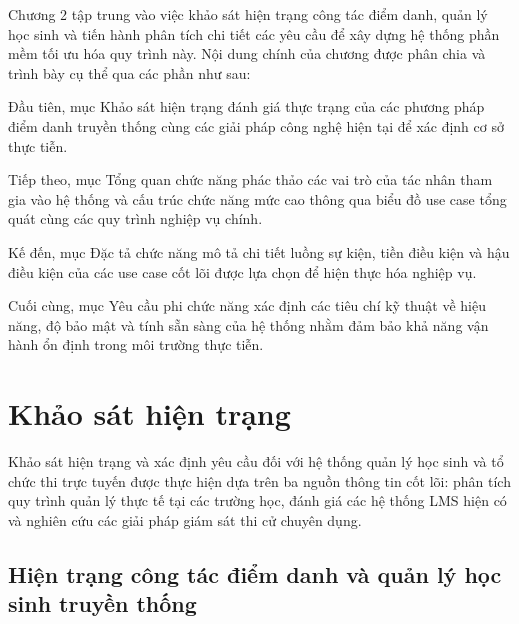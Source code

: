 \documentclass[../DoAn.tex]{subfiles}
\begin{document}


Chương 2 tập trung vào việc khảo sát hiện trạng công tác điểm danh, quản lý học sinh và tiến hành phân tích chi tiết các yêu cầu để xây dựng hệ thống phần mềm tối ưu hóa quy trình này. Nội dung chính của chương được phân chia và trình bày cụ thể qua các phần như sau:

Đầu tiên, mục Khảo sát hiện trạng đánh giá thực trạng của các phương pháp điểm danh truyền thống cùng các giải pháp công nghệ hiện tại để xác định cơ sở thực tiễn.

Tiếp theo, mục Tổng quan chức năng phác thảo các vai trò của tác nhân tham gia vào hệ thống và cấu trúc chức năng mức cao thông qua biểu đồ use case tổng quát cùng các quy trình nghiệp vụ chính.

Kế đến, mục Đặc tả chức năng mô tả chi tiết luồng sự kiện, tiền điều kiện và hậu điều kiện của các use case cốt lõi được lựa chọn để hiện thực hóa nghiệp vụ.

Cuối cùng, mục Yêu cầu phi chức năng xác định các tiêu chí kỹ thuật về hiệu năng, độ bảo mật và tính sẵn sàng của hệ thống nhằm đảm bảo khả năng vận hành ổn định trong môi trường thực tiễn.


\section{Khảo sát hiện trạng}

\label{section:2.1}

Khảo sát hiện trạng và xác định yêu cầu đối với hệ thống quản lý học sinh và tổ chức thi trực tuyến được thực hiện dựa trên ba nguồn thông tin cốt lõi: phân tích quy trình quản lý thực tế tại các trường học, đánh giá các hệ thống LMS hiện có và nghiên cứu các giải pháp giám sát thi cử chuyên dụng.

\subsection{Hiện trạng công tác điểm danh và quản lý học sinh truyền thống}

\label{subsection:2.1.1}
\end{document}
